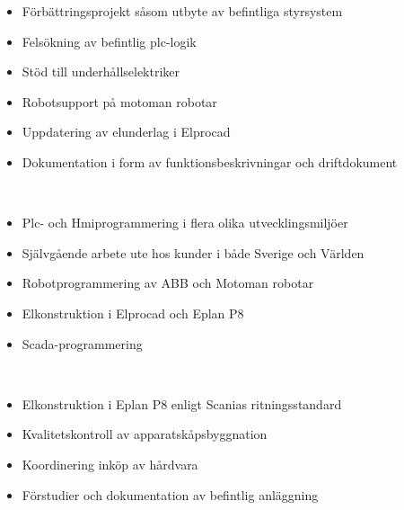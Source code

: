 \documentclass[10pt,a4paper,ragged2e,withhyper]{altacv}
\begin{document}
\begin{paracol}{2}

\begin{itemize}
\item Förbättringsprojekt såsom utbyte av befintliga styrsystem
\item Felsökning av befintlig plc-logik
\item Stöd till underhållselektriker
\item Robotsupport på motoman robotar
\item Uppdatering av elunderlag i Elprocad
\item Dokumentation i form av funktionsbeskrivningar och driftdokument
\end{itemize}
\\
\divider

\begin{itemize}
\item Plc- och Hmiprogrammering i flera olika utvecklingsmiljöer
\item Självgående arbete ute hos kunder i både Sverige och Världen
\item Robotprogrammering av ABB och Motoman robotar
\item Elkonstruktion i Elprocad och Eplan P8
\item Scada-programmering
\end{itemize}
\\

\begin{itemize}
\item Elkonstruktion i Eplan P8 enligt Scanias ritningsstandard
\item Kvalitetskontroll av apparatskåpsbyggnation
\item Koordinering inköp av hårdvara
\item Förstudier och dokumentation av befintlig anläggning
\end{itemize}


\end{paracol}
\end{document}
